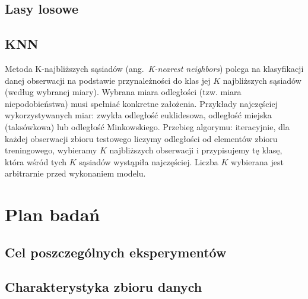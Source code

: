 \documentclass{article}
\newcommand{\TODO}[1]{\textcolor{blue}{TODO: #1}}
\newcommand{\ang}[1]{ang.~{\itshape #1}}
\begin{document}
\subsection{Lasy losowe}

\subsection{KNN}
Metoda K-najbliższych sąsiadów (\ang{K-nearest neighbors}) polega na klasyfikacji danej obserwacji na podstawie przynależności do klas jej $K$ najbliższych sąsiadów (według wybranej miary). Wybrana miara odległości (tzw. miara niepodobieństwa) musi spełniać konkretne założenia. Przykłady najczęściej wykorzystywanych miar: zwykła odległość euklidesowa, odległość miejska (taksówkowa) lub odległość Minkowskiego. Przebieg algorymu: iteracyjnie, dla każdej obserwacji zbioru testowego liczymy odległości od elementów zbioru treningowego, wybieramy $K$ najbliższych obserwacji i przypisujemy tę klasę, która wśród tych $K$ sąsiadów wystąpiła najczęściej. Liczba $K$ wybierana jest arbitrarnie przed wykonaniem modelu.

\section{Plan badań}

\subsection{Cel poszczególnych eksperymentów}
\subsection{Charakterystyka zbioru danych}
\end{document}
